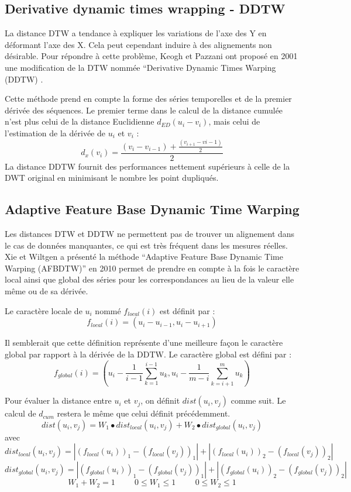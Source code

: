 \subsection{Derivative dynamic times wrapping - DDTW}
La distance DTW a tendance à expliquer les variations de l’axe des Y en déformant l’axe des X. Cela peut cependant induire à des alignements non désirable. Pour répondre à cette problème, Keogh et Pazzani ont proposé en 2001 une modification de la DTW nommée “Derivative Dynamic Times Warping (DDTW) \cite{keogh2001}. 

Cette méthode prend en compte la forme des séries temporelles et de la premier dérivée des séquences. Le premier terme dans le calcul de la distance cumulée n’est plus celui de la distance Euclidienne $d_{ED} (u_i  - v_i)$, mais celui de l’estimation de la dérivée de $u_i$ et $v_i$ :
$$d_x(v_i) = \frac{(v_i - v_{i - 1}) + \frac{(v_{i + 1} - v{i - 1} )} {2}    } {2} $$
La distance DDTW fournit des performances nettement supérieurs à celle de la DWT original en minimisant le nombre les point dupliqués.
\subsection{Adaptive Feature Base Dynamic Time Warping }
Les distances DTW et DDTW ne permettent pas de trouver un alignement dans le cas de données manquantes, ce qui est très fréquent dans les mesures réelles. Xie et Wiltgen a présenté la méthode “Adaptive Feature Base Dynamic Time Warping (AFBDTW)” en 2010 \cite{xie2010} permet de prendre en compte à la fois le caractère local ainsi que global des séries pour les correspondances au lieu de la valeur elle même ou de sa dérivée.

Le caractère locale de $u_i$ nommé $f_{local}(i)$ est définit par : 
$$f_{local}(i) = (u_i - u_{i-1}, u_i - u_{i+1} )$$

Il semblerait que cette définition représente d’une meilleure façon le caractère global par rapport à la dérivée de la DDTW. Le caractère global est défini par :
$$f_{global}(i) = (u_i - \frac{1}{i-1} \sum_{k = 1}^{i - 1} {u_k}, u_i -  \frac{1}{m - i} \sum_{k = i + 1}^{m} {u_k} ) $$

Pour évaluer la distance entre $u_i$ et $v_j$, on définit $dist(u_i, v_j)$ comme suit. Le calcul de $d_{cum}$ restera le même que celui définit précédemment.
$$dist(u_i, v_j) = W_1 \bullet dist_{local} (u_i, v_j) + W_2 \bullet dist_{global}(u_i, v_j)$$
avec 
$$dist_{local} (u_i, v_j) = | (f_{local}(u_i))_1 - (f_{local}(v_j))_1  | + | (f_{local}(u_i))_2 - (f_{local}(v_j))_2  | $$
$$dist_{global}(u_i, v_j) = | (f_{global}(u_i))_1 - (f_{global}(v_j))_1  | + | (f_{global}(u_i))_2 - (f_{global}(v_j))_2  | $$
$$W_1 + W_2 = 1 \hspace{1cm} 0 \leq W_1 \leq 1 \hspace{1cm} 0 \leq W_2 \leq 1$$

